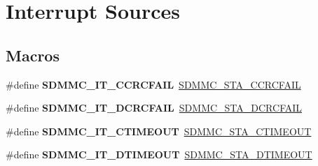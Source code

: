\hypertarget{group___s_d_m_m_c___l_l___interrupt__sources}{}\section{Interrupt Sources}
\label{group___s_d_m_m_c___l_l___interrupt__sources}
\subsection*{Macros}
\begin{DoxyCompactItemize}
\item 
\mbox{\label{group___s_d_m_m_c___l_l___interrupt__sources_gaadf6921396f988a3aa231455fc4c8ff6}} 
\#define {\bfseries S\+D\+M\+M\+C\+\_\+\+I\+T\+\_\+\+C\+C\+R\+C\+F\+A\+IL}~\mbox{\hyperlink{group___peripheral___registers___bits___definition_gae302f98431500f3be2d22e8a2b1997c2}{S\+D\+M\+M\+C\+\_\+\+S\+T\+A\+\_\+\+C\+C\+R\+C\+F\+A\+IL}}
\item 
\mbox{\label{group___s_d_m_m_c___l_l___interrupt__sources_gacb6e3a8c833631734370a2e5dcee5777}} 
\#define {\bfseries S\+D\+M\+M\+C\+\_\+\+I\+T\+\_\+\+D\+C\+R\+C\+F\+A\+IL}~\mbox{\hyperlink{group___peripheral___registers___bits___definition_ga512955c76ca837d151737835bfe0b50a}{S\+D\+M\+M\+C\+\_\+\+S\+T\+A\+\_\+\+D\+C\+R\+C\+F\+A\+IL}}
\item 
\mbox{\label{group___s_d_m_m_c___l_l___interrupt__sources_ga26bc64cc4efad8a95589ceffad731445}} 
\#define {\bfseries S\+D\+M\+M\+C\+\_\+\+I\+T\+\_\+\+C\+T\+I\+M\+E\+O\+UT}~\mbox{\hyperlink{group___peripheral___registers___bits___definition_ga2a1bea5b39c521d3338af0a0a2f4f465}{S\+D\+M\+M\+C\+\_\+\+S\+T\+A\+\_\+\+C\+T\+I\+M\+E\+O\+UT}}
\item 
\mbox{\label{group___s_d_m_m_c___l_l___interrupt__sources_ga9e0bcb2fb0ffbb7f83f93d26cdd38b0b}} 
\#define {\bfseries S\+D\+M\+M\+C\+\_\+\+I\+T\+\_\+\+D\+T\+I\+M\+E\+O\+UT}~\mbox{\hyperlink{group___peripheral___registers___bits___definition_ga0330b309e3b0256dab5ae86898b4304d}{S\+D\+M\+M\+C\+\_\+\+S\+T\+A\+\_\+\+D\+T\+I\+M\+E\+O\+UT}}
\item 
\mbox{\label{group___s_d_m_m_c___l_l___interrupt__sources_ga094aadf781acda6d21baf82cf4e4bd48}} 

\end{DoxyCompactItemize}
